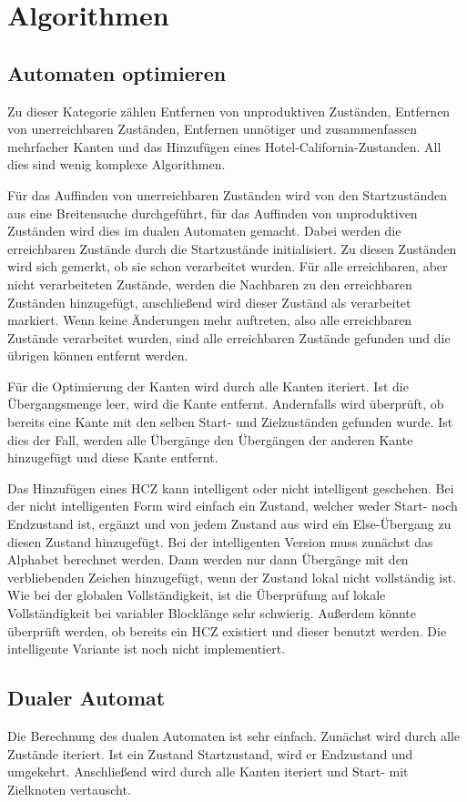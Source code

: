 \section{Algorithmen}
\subsection{Automaten optimieren}
Zu dieser Kategorie zählen Entfernen von unproduktiven Zuständen, Entfernen von unerreichbaren Zuständen, Entfernen unnötiger und zusammenfassen mehrfacher Kanten und das Hinzufügen eines Hotel-California-Zustanden. All dies sind wenig komplexe Algorithmen.

Für das Auffinden von unerreichbaren Zuständen wird von den Startzuständen aus eine Breitensuche durchgeführt, für das Auffinden von unproduktiven Zuständen wird dies im dualen Automaten gemacht. Dabei werden die erreichbaren Zustände durch die Startzustände initialisiert. Zu diesen Zuständen wird sich gemerkt, ob sie schon verarbeitet wurden. Für alle erreichbaren, aber nicht verarbeiteten Zustände, werden die Nachbaren zu den erreichbaren Zuständen hinzugefügt, anschließend wird dieser Zuständ als verarbeitet markiert. Wenn keine Änderungen mehr auftreten, also alle erreichbaren Zustände verarbeitet wurden, sind alle erreichbaren Zustände gefunden und die übrigen können entfernt werden.

Für die Optimierung der Kanten wird durch alle Kanten iteriert. Ist die Übergangsmenge leer, wird die Kante entfernt. Andernfalls wird überprüft, ob bereits eine Kante mit den selben Start- und Zielzuständen gefunden wurde. Ist dies der Fall, werden alle Übergänge den Übergängen der anderen Kante hinzugefügt und diese Kante entfernt.

Das Hinzufügen eines HCZ kann intelligent oder nicht intelligent geschehen. Bei der nicht intelligenten Form wird einfach ein Zustand, welcher weder Start- noch Endzustand ist, ergänzt und von jedem Zustand aus wird ein Else-Übergang zu diesen Zustand hinzugefügt. Bei der intelligenten Version muss zunächst das Alphabet berechnet werden. Dann werden nur dann Übergänge mit den verbliebenden Zeichen hinzugefügt, wenn der Zustand lokal nicht vollständig ist. Wie bei der globalen Vollständigkeit, ist die Überprüfung auf lokale Vollständigkeit bei variabler Blocklänge sehr schwierig. Außerdem könnte überprüft werden, ob bereits ein HCZ existiert und dieser benutzt werden. Die intelligente Variante ist noch nicht implementiert.
\subsection{Dualer Automat}
Die Berechnung des dualen Automaten ist sehr einfach. Zunächst wird durch alle Zustände iteriert. Ist ein Zustand Startzustand, wird er Endzustand und umgekehrt. Anschließend wird durch alle Kanten iteriert und Start- mit Zielknoten vertauscht.
